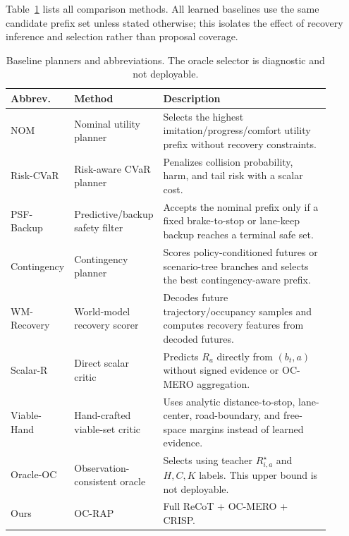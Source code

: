 \documentclass[conference]{IEEEtran}
\begin{document}
Table~\ref{tab:baseline_definitions} lists all comparison methods.  All learned baselines use the same candidate prefix set unless stated otherwise; this isolates the effect of recovery inference and selection rather than proposal coverage.

\begin{table}[t]
\centering
\footnotesize
\caption{Baseline planners and abbreviations.  The oracle selector is diagnostic and not deployable.}
\label{tab:baseline_definitions}
\begin{tabular}{p{0.12\linewidth}p{0.24\linewidth}p{0.54\linewidth}}
\toprule
Abbrev. & Method & Description \\
\midrule
NOM & Nominal utility planner & Selects the highest imitation/progress/comfort utility prefix without recovery constraints. \\
Risk-CVaR & Risk-aware CVaR planner~\cite{uryasev2000conditional,hakobyan2021wasserstein,safaoui2024distributionally} & Penalizes collision probability, harm, and tail risk with a scalar cost. \\
PSF-Backup & Predictive/backup safety filter~\cite{koller2018learning,wabersich2021predictive,tearle2021predictive,kim2026backup} & Accepts the nominal prefix only if a fixed brake-to-stop or lane-keep backup reaches a terminal safe set. \\
Contingency & Contingency planner~\cite{li2023marc,mustafa2024racp} & Scores policy-conditioned futures or scenario-tree branches and selects the best contingency-aware prefix. \\
WM-Recovery & World-model recovery scorer~\cite{ding2025understanding,hu2025survey} & Decodes future trajectory/occupancy samples and computes recovery features from decoded futures. \\
Scalar-R & Direct scalar critic & Predicts $R_a$ directly from $(b_t,a)$ without signed evidence or OC-MERO aggregation. \\
Viable-Hand & Hand-crafted viable-set critic~\cite{bansal2017hamilton,ames2019control} & Uses analytic distance-to-stop, lane-center, road-boundary, and free-space margins instead of learned evidence. \\
Oracle-OC & Observation-consistent oracle & Selects using teacher $R_{i,a}^{\star}$ and $H,C,K$ labels.  This upper bound is not deployable. \\
Ours & OC-RAP & Full ReCoT + OC-MERO + CRISP. \\
\bottomrule
\end{tabular}
\end{table}
\end{document}
